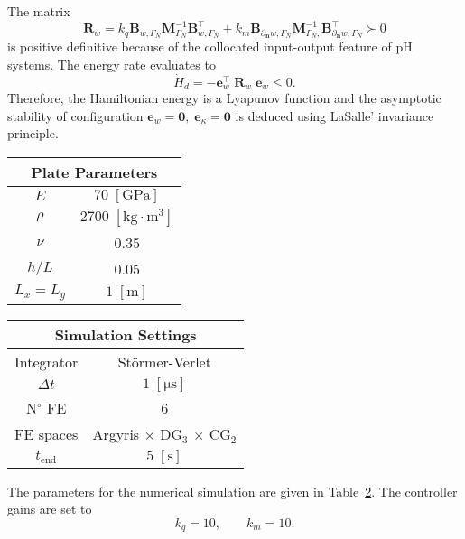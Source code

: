 The matrix 
$$\mathbf{R}_w = k_q \mathbf{B}_{w, \Gamma_N} \mathbf{M}_{\Gamma_N}^{-1} \mathbf{B}_{w, \Gamma_N}^\top + k_m \mathbf{B}_{\partial_{\bm{n}} w, \Gamma_N} \mathbf{M}_{\Gamma_N,}^{-1} \mathbf{B}_{\partial_{\bm{n}} w, \Gamma_N}^\top \succ 0$$
 is positive definitive because of the collocated input-output feature of pH systems. The energy rate evaluates to \cite[Theorem 13]{beattie2018linear}
\[\dot{H} _{d} = - \mathbf{e}_{w}^\top \; \mathbf{R}_w \; \mathbf{e}_{w} \le 0. \]
Therefore, the Hamiltonian energy is a Lyapunov function and the asymptotic stability of configuration $\mathbf{e}_{w} = \mathbf{0}, \; \mathbf{e}_{\kappa} = \mathbf{0}$ is deduced using LaSalle' invariance  principle. \\


\begin{table}[t]
	\centering
	\begin{tabular}{|c|c|}
		\hline 
		\multicolumn{2}{|c|}{Plate Parameters} \\ 
		\hline 
		$E$ & $70\; \mathrm{[GPa]}$ \\ 
		$\rho$ & $2700\; \mathrm{[kg \cdot m^3]}$ \\ 
		$\nu$& 0.35 \\ 
		$h/L$& 0.05 \\ 
		$L_x = L_y$& $1\; \mathrm{[m]}$\\ 
		\hline 
	\end{tabular} \hspace{1cm}
	\begin{tabular}{|c|c|}
		\hline 
		\multicolumn{2}{|c|}{Simulation Settings} \\
		\hline 
		Integrator & St\"ormer-Verlet \\
		$\Delta t $ & $1 \; \mathrm{[\mu s]}$ \\  
		N$^\circ$ FE & 6 \\
		FE spaces & Argyris $\times$ DG$_3$ $\times$ CG$_2$\\
		$t_{\text{end}}$ & $5\; \mathrm{[s]}$\\ 
		\hline 
	\end{tabular} 
	\captionsetup{width=0.95\linewidth}
	\vspace{1mm}
	\label{tab:parKir_damp}
\end{table}

The parameters for the numerical simulation are given in Table~\ref{tab:parKir_damp}. The controller gains are set to 
\begin{equation}
	k_q = 10, \qquad k_m = 10.
\end{equation}

